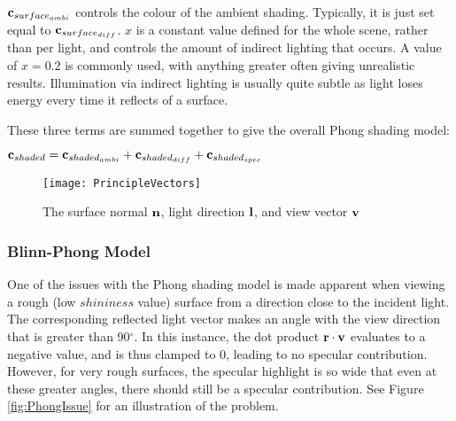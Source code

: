 \begin{math}\mathbf{c}_{surface_{ambi}}\end{math} controls the colour of the ambient shading. Typically, it is just set equal to \begin{math}\mathbf{c}_{surface_{diff}}\end{math}. \begin{math}x\end{math} is a constant value defined for the whole scene, rather than per light, and controls the amount of indirect lighting that occurs. A value of \begin{math}x = 0.2\end{math} is commonly used, with anything greater often giving unrealistic results. Illumination via indirect lighting is usually quite subtle as light loses energy every time it reflects of a surface.

These three terms are summed together to give the overall Phong shading model:

\begin{center}
	\begin{math}\mathbf{c}_{shaded} = \mathbf{c}_{shaded_{ambi}} + \mathbf{c}_{shaded_{diff}} + \mathbf{c}_{shaded_{spec}}\end{math}
\end{center}

\begin{figure}[h]
	\centering
	\texttt{[image: PrincipleVectors]}
	\caption{The surface normal \begin{math}\mathbf{n}\end{math}, light direction \begin{math}\mathbf{l}\end{math}, and view vector \begin{math}\mathbf{v}\end{math}~\cite{RTR4}}
	\label{fig:PrincipleVectors}
\end{figure}

\subsubsection{Blinn-Phong Model}

One of the issues with the Phong shading model is made apparent when viewing a rough (low \begin{math}shininess\end{math} value) surface from a direction close to the incident light. The corresponding reflected light vector makes an angle with the view direction that is greater than 90$^{\circ}$. In this instance, the dot product \begin{math}\mathbf{r}\cdot\mathbf{v}\end{math} evaluates to a negative value, and is thus clamped to 0, leading to no specular contribution. However, for very rough surfaces, the specular highlight is so wide that even at these greater angles, there should still be a specular contribution. See Figure \ref{fig:PhongIssue} for an illustration of the problem.

